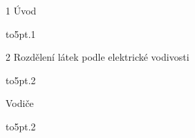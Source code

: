 \noindent \hskip 5mm 1\hskip 2mm {\fam \bffam \tenbf Úvod} {\leaders \hbox to5pt{\hss .\hss }\hfill 1\par }
\noindent \hskip 5mm 2\hskip 2mm {\fam \bffam \tenbf Rozdělení látek podle elektrické vodivosti} {\leaders \hbox to5pt{\hss .\hss }\hfill 2\par }
\hskip 3mm {\hskip 2mm Vodiče} {\leaders \hbox to5pt{\hss .\hss }\hfill 2\par }
